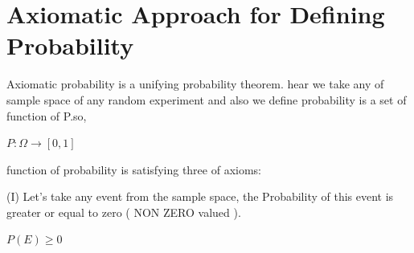 \documentclass[a4paper,12pt]{article}
\theoremstyle{definition}
\begin{document}
\section {Axiomatic Approach for Defining Probability}
\par Axiomatic probability is a unifying probability theorem. hear we take any of sample space of any random experiment and also we define probability  is a set of function of P.so,
  \begin{center}
      $ P : \Omega \to [0 , 1] $
  \end{center}
\par function of probability is satisfying three of axioms:\\
\vskip 0.25cm
\par (I) Let's take any event from the sample space, the Probability of this event is greater or equal to zero ( NON ZERO valued ).
         \begin{center}
             $P(E)\geq 0 $
         \end{center}\\
         
\end{document}
